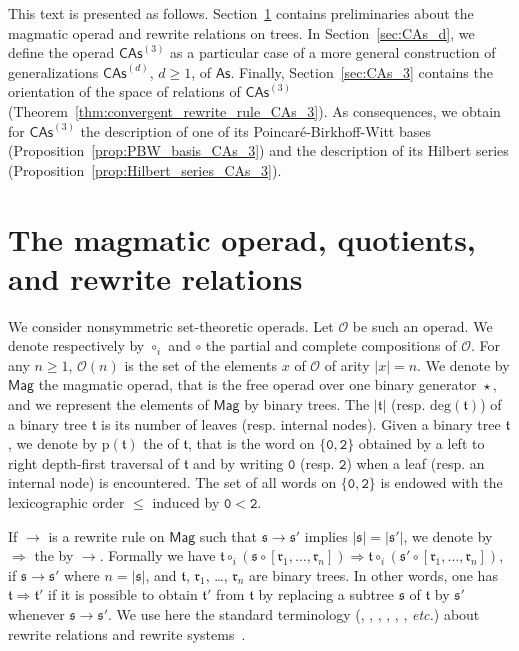 \documentclass[10pt,reqno]{amsart}
\numberwithin{equation}{subsection}
\renewcommand{\leq}{\leqslant}
\renewcommand{\geq}{\geqslant}
\newcommand{\Oca}{\mathcal{O}}
\newcommand{\Rfr}{\mathfrak{r}}
\newcommand{\Sfr}{\mathfrak{s}}
\newcommand{\Tfr}{\mathfrak{t}}
\newcommand{\Zero}{\mathtt{0}}
\newcommand{\Two}{\mathtt{2}}
\newcommand{\Mag}{\mathsf{Mag}}
\newcommand{\As}{\mathsf{As}}
\newcommand{\CAs}[1]{\mathsf{CAs}^{(#1)}}
\newcommand{\PrefixWord}{\mathrm{p}}
\newcommand{\Deg}{\mathrm{deg}}
\DeclareMathOperator{\Product}{\star}
\DeclareMathOperator{\Rew}{\to}
\DeclareMathOperator{\RewContext}{\Rightarrow}
\begin{document}
This text is presented as follows. Section~\ref{sec:operad_Mag} contains
preliminaries about the magmatic operad and rewrite relations on trees.
In Section~\ref{sec:CAs_d}, we define the operad $\CAs{3}$ as a
particular case of a more general construction of generalizations
$\CAs{d}$, $d \geq 1$, of $\As$. Finally, Section~\ref{sec:CAs_3}
contains the orientation of the space of relations of
$\CAs{3}$ (Theorem~\ref{thm:convergent_rewrite_rule_CAs_3}). As
consequences, we obtain for $\CAs{3}$
the description of one of its Poincaré-Birkhoff-Witt bases
(Proposition~\ref{prop:PBW_basis_CAs_3}) and the description of
its Hilbert series (Proposition~\ref{prop:Hilbert_series_CAs_3}).


\section{The magmatic operad, quotients, and rewrite relations}
\label{sec:operad_Mag}
We consider nonsymmetric set-theoretic operads. Let $\Oca$ be such an
operad. We denote respectively by $\circ_i$ and $\circ$ the partial and
complete compositions of $\Oca$. For any $n \geq 1$, $\Oca(n)$ is the
set of the elements $x$ of $\Oca$ of arity $|x| = n$. We denote
by $\Mag$ the magmatic operad, that is the free operad over one binary
generator $\Product$, and we represent the elements of $\Mag$ by binary
trees. The  $|\Tfr|$ (resp.  $\Deg(\Tfr)$) of a
binary tree $\Tfr$ is its number of leaves (resp. internal nodes).
Given a binary tree $\Tfr$, we denote by $ \PrefixWord(\Tfr)$ the
 of $\Tfr$, that is the word on $\{\Zero, \Two\}$
obtained by a left to right depth-first traversal of $\Tfr$ and by
writing $\Zero$ (resp. $\Two$) when a leaf (resp. an internal node) is
encountered. The set of all words on $\{\Zero, \Two\}$ is endowed with
the lexicographic order $\leq$ induced by $\Zero < \Two$.

If $\Rew$ is a rewrite rule on $\Mag$ such that $\Sfr \Rew \Sfr'$ 
implies $|\Sfr| = |\Sfr'|$, we denote by $\RewContext$ the
 by $\Rew$. Formally we have
\begin{math}
    \Tfr\circ_i\left(\Sfr\circ\left[\Rfr_1,\dots,\Rfr_{n}\right]\right)
    \RewContext
    \Tfr\circ_i\left(\Sfr'\circ\left[\Rfr_1,\dots,\Rfr_{n}\right]\right)
\end{math},
if $\Sfr \Rew \Sfr'$ where $n = |\Sfr|$, and $\Tfr$, $\Rfr_1$, \dots,
$\Rfr_n$ are binary trees. In other words, one has
$\Tfr \RewContext \Tfr'$ if it is possible to obtain $\Tfr'$ from $\Tfr$
by replacing a subtree $\Sfr$ of $\Tfr$ by $\Sfr'$ whenever
$\Sfr \Rew \Sfr'$. We use here the standard terminology
(, , , , , , {\em etc.}) about rewrite
relations and rewrite systems~\cite{BN98}.
\end{document}
